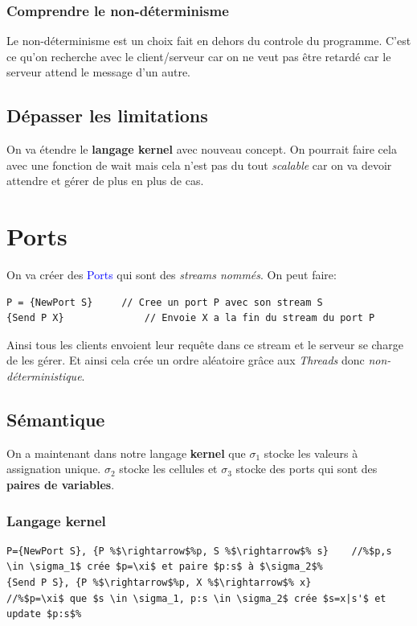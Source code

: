 \documentclass{report}
\begin{document}
\subsubsection{Comprendre le non-déterminisme} 
Le non-déterminisme est un choix fait en dehors du controle du programme. C'est ce qu'on recherche avec le client/serveur car on ne veut pas être retardé car le serveur attend le message d'un autre.

\subsection{Dépasser les limitations}
On va étendre le \textbf{langage kernel} avec nouveau concept. On pourrait faire cela avec une fonction de wait mais cela n'est pas du tout \textit{scalable} car on va devoir attendre et gérer de plus en plus de cas.

\section{Ports}
On va créer des \textcolor{blue}{Ports} qui sont des \textit{streams nommés}. On peut faire:
\begin{lstlisting}[escapechar=\%]
P = {NewPort S} 	// Cree un port P avec son stream S
{Send P X}	 			// Envoie X a la fin du stream du port P
\end{lstlisting}
Ainsi tous les clients envoient leur requête dans ce stream et le serveur se charge de les gérer. Et ainsi cela crée un ordre aléatoire grâce aux \textit{Threads} donc \textit{non-déterministique}.

\subsection{Sémantique}
On a maintenant dans notre langage \textbf{kernel} que $\sigma_1$ stocke les valeurs à assignation unique. $\sigma_2$ stocke les cellules et $\sigma_3$ stocke des ports qui sont des \textbf{paires de variables}.

\subsubsection{Langage kernel}
\begin{lstlisting}[escapechar=\%]
P={NewPort S}, {P %$\rightarrow$%p, S %$\rightarrow$% s}	//%$p,s \in \sigma_1$ crée $p=\xi$ et paire $p:s$ à $\sigma_2$%
{Send P S}, {P %$\rightarrow$%p, X %$\rightarrow$% x}			//%$p=\xi$ que $s \in \sigma_1, p:s \in \sigma_2$ crée $s=x|s'$ et update $p:s$%
\end{lstlisting}
\end{document}

